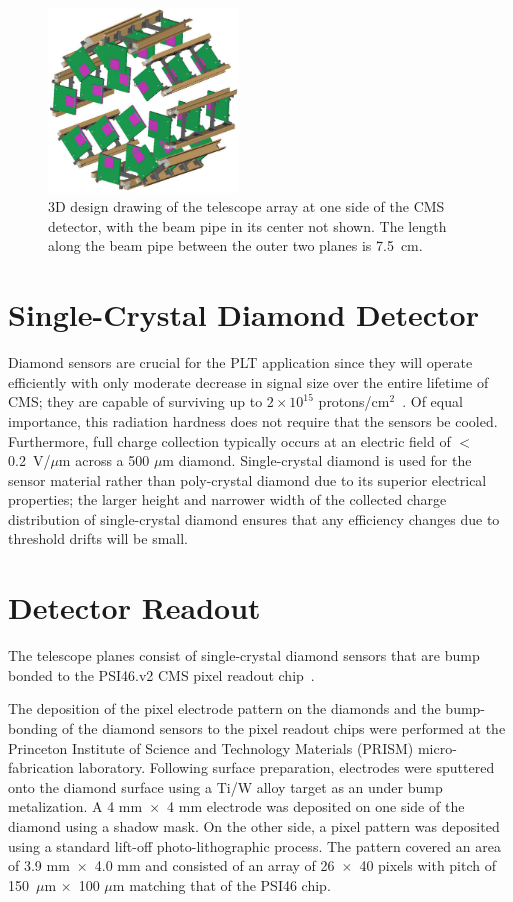 \documentclass[journal]{IEEEtran}
\begin{document}
\begin{figure}[!h]
\centering
\includegraphics[width=0.45\textwidth]{PLT-Telescope}
\caption{3D design drawing of the telescope array at one side of the CMS detector, with the beam pipe in its center not shown. The length along the beam pipe between the outer two planes  is 7.5~cm. }
\label{plt-location}
\end{figure}

%
%
\section{Single-Crystal Diamond Detector}

Diamond sensors are crucial for the PLT application since they will operate efficiently with only
moderate decrease in signal size over the entire lifetime of CMS; they are capable of surviving up to $2\times10^{15}$ protons/cm$^2$~\cite{DiamondDetectors}. Of equal importance, this radiation hardness does not require that the sensors be cooled.  Furthermore, full charge collection typically occurs at an electric field of $<$ 0.2~V/$\mu$m across a 500 $\mu$m diamond.  
Single-crystal diamond is used for the sensor material rather than poly-crystal diamond due to its superior electrical properties; the larger height and narrower width of the collected charge distribution of single-crystal diamond ensures that any efficiency changes due to threshold
drifts will be small.

%
%
\section{Detector Readout}
The telescope planes consist of single-crystal diamond sensors that are bump bonded to the PSI46.v2 CMS pixel readout
chip~\cite{psi46}.

The deposition of the pixel electrode pattern on the diamonds and the bump-bonding of the diamond
sensors to the pixel readout chips were performed at the Princeton Institute of Science and Technology 
Materials (PRISM) micro-fabrication laboratory. Following surface preparation, electrodes
were sputtered onto the diamond surface using a Ti/W alloy target as an under bump metalization. A 4 mm~$\times$~4 mm electrode was deposited on one side of the diamond using a shadow mask. 
On the other side, a pixel pattern was deposited using a standard lift-off photo-lithographic process. 
The pattern covered an area of 3.9 mm~$\times$~4.0 mm and consisted of an array of 26~$\times$~40 pixels 
with pitch of 150~$\mu$m $\times$~100 $\mu$m matching that of the PSI46 chip.
\end{document}
